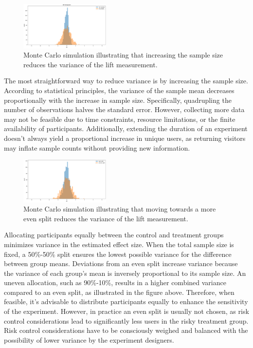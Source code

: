 \documentclass[final,5p,times,twocolumn,authoryear]{elsarticle}
\begin{document}
\begin{figure}[h]
  \centering 
  \includegraphics[width=0.4\textwidth]{fig-1.png}  
  \caption{Monte Carlo simulation illustrating that increasing the sample size reduces the variance of the lift measurement.} 
\end{figure}

The most straightforward way to reduce variance is by increasing the sample size. According to statistical principles, the variance of the sample mean decreases proportionally with the increase in sample size. Specifically, quadrupling the number of observations halves the standard error. However, collecting more data may not be feasible due to time constraints, resource limitations, or the finite availability of participants. Additionally, extending the duration of an experiment doesn't always yield a proportional increase in unique users, as returning visitors may inflate sample counts without providing new information.

\begin{figure}[h]
  \centering 
  \includegraphics[width=0.4\textwidth]{fig-2.png}  
  \caption{Monte Carlo simulation illustrating that moving towards a more even split reduces the variance of the lift measurement.} 
\end{figure}

Allocating participants equally between the control and treatment groups minimizes variance in the estimated effect size. When the total sample size is fixed, a 50\%-50\% split ensures the lowest possible variance for the difference between group means. Deviations from an even split increase variance because the variance of each group's mean is inversely proportional to its sample size. An uneven allocation, such as 90\%-10\%, results in a higher combined variance compared to an even split, as illustrated in the figure above. Therefore, when feasible, it's advisable to distribute participants equally to enhance the sensitivity of the experiment. However, in practice an even split is usually not chosen, as risk control considerations lead to significantly less users in the risky treatment group. Risk control considerations have to be consciously weighed and balanced with the possibility of lower variance by the experiment designers.
\end{document}
